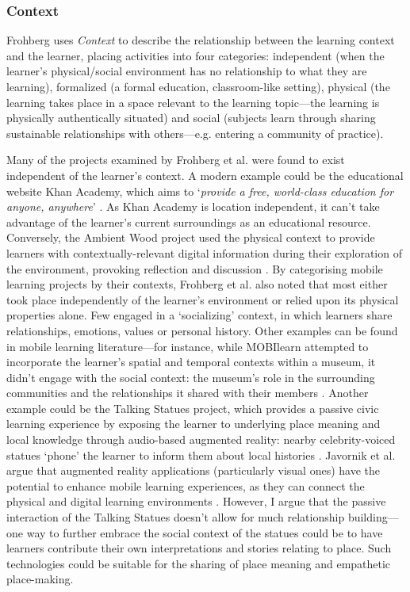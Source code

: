 \subsubsection{Context}
Frohberg uses \textit{Context} to describe the relationship between the learning context and the learner, placing activities into four categories: independent (when the learner's physical/social environment has no relationship to what they are learning), formalized (a formal education, classroom-like setting), physical (the learning takes place in a space relevant to the learning topic---the learning is physically authentically situated) and social (subjects learn through sharing sustainable relationships with others---e.g. entering a community of practice). 

Many of the projects examined by Frohberg et al. were found to exist independent of the learner’s context. A modern example could be the educational website Khan Academy, which aims to ‘\textit{provide a free, world-class education for anyone, anywhere}’ \citep{Khan2011}. As Khan Academy is location independent, it can’t take advantage of the learner’s current surroundings as an educational resource. Conversely, the Ambient Wood project used the physical context to provide learners with contextually-relevant digital information during their exploration of the environment, provoking reflection and discussion \citep{Rogers2004}. By categorising mobile learning projects by their contexts, Frohberg et al. also noted that most either took place independently of the learner’s environment or relied upon its physical properties alone. Few engaged in a `socializing' context, in which learners share relationships, emotions, values or personal history. Other examples can be found in mobile learning literature---for instance, while MOBIlearn attempted to incorporate the learner’s spatial and temporal contexts within a museum, it didn't engage with the social context: the museum’s role in the surrounding communities and the relationships it shared with their members \citep{Lonsdale2004}. Another example could be the Talking Statues project, which provides a passive civic learning experience by exposing the learner to underlying place meaning and local knowledge through audio-based augmented reality: nearby celebrity-voiced statues ‘phone’ the learner to inform them about local histories \citep{Sing2017}. Javornik et al. argue that augmented reality applications (particularly visual ones) have the potential to enhance mobile learning experiences, as they can connect the physical and digital learning environments \citep{javornik2019}. However, I argue that the passive interaction of the Talking Statues doesn't allow for much relationship building---one way to further embrace the social context of the statues could be to have learners contribute their own interpretations and stories relating to place. Such technologies could be suitable for the sharing of place meaning and empathetic place-making.

